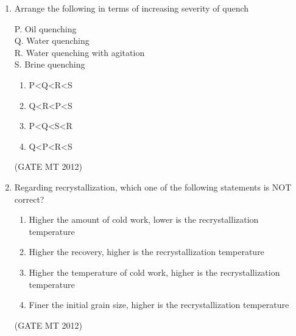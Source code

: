\documentclass[journal, 11pt, onecolumn]{IEEEtran}
\theoremstyle{remark}
\begin{document}
\begin{enumerate}
\begin{enumerate}
\begin{multicols}{2}
\underline{Group 2}
\begin{enumerate}[label=(\arabic*), start=1]
\item bcc 
\item fcc
\item bct
\item Orthorhombic
\end{enumerate}
\end{multicols}

\begin{multicols}{2}
\begin{enumerate}  
\item P-3, Q-4, R-1, S-2
\item P-2, Q-3, R-1, S-4
\item P-3, Q-4, R-2, S-1
\item P-4, Q-3, R-2, S-1
\end{enumerate}
\end{multicols}
\hfill(GATE MT 2012)

\item Arrange the following in terms of increasing severity of quench

P. Oil quenching \\
Q. Water quenching \\
R. Water quenching with agitation \\
S. Brine quenching

\begin{multicols}{2}
\begin{enumerate}  
\item P<Q<R<S
\item Q<R<P<S
\item P<Q<S<R
\item Q<P<R<S
\end{enumerate}
\end{multicols}
\hfill(GATE MT 2012)

\item Regarding recrystallization, which one of the following statements is NOT correct?

\begin{enumerate}  
\item Higher the amount of cold work, lower is the recrystallization temperature
\item Higher the recovery, higher is the recrystallization temperature
\item Higher the temperature of cold work, higher is the recrystallization temperature
\item Finer the initial grain size, higher is the recrystallization temperature
\end{enumerate}
\hfill(GATE MT 2012)


\end{enumerate}
\end{enumerate}
\end{document}
